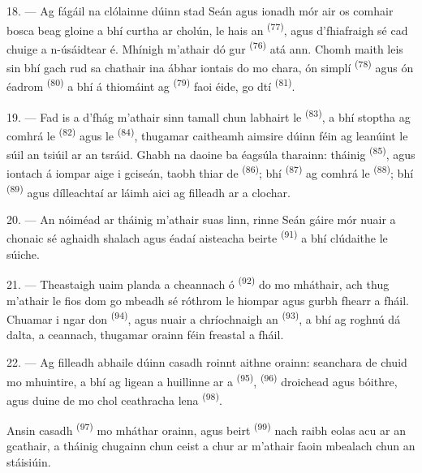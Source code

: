 \VUsaut{3.0mm}

18. --- Ag fágáil na clólainne dúinn stad Seán agus ionadh mór air os comhair bosca
beag gloine a bhí curtha ar cholún, le hais an 
\textsuperscript{(77)}, agus d'fhiafraigh sé cad chuige a n-úsáidtear é. Mhínigh
m'athair dó gur  \textsuperscript{(76)} atá ann. Chomh maith
leis sin bhí gach rud sa chathair ina ábhar iontais do mo chara, ón
 simplí \textsuperscript{(78)} agus ón  éadrom \textsuperscript{(80)} a bhí á thiomáint ag 
\textsuperscript{(79)} faoi éide, go dtí 
\textsuperscript{(81)}.

19. --- Fad is a d'fhág m'athair sinn tamall chun labhairt le  \textsuperscript{(83)}, a bhí stoptha ag comhrá le 
\textsuperscript{(82)} agus le  \textsuperscript{(84)}, thugamar
caitheamh aimsire dúinn féin ag leanúint le súil an tsiúil ar an tsráid. Ghabh na
daoine ba éagsúla tharainn: tháinig 
\textsuperscript{(85)}, agus  iontach á iompar aige i gciseán, taobh
thiar de  \textsuperscript{(86)}; bhí  \textsuperscript{(87)} ag comhrá le 
\textsuperscript{(88)}; bhí  \textsuperscript{(89)} agus
dílleachtaí ar láimh aici ag filleadh ar a clochar.

\VUsaut{3.0mm}

20. --- An nóiméad ar tháinig m'athair suas linn, rinne Seán gáire mór nuair a chonaic
sé aghaidh shalach agus éadaí aisteacha beirte 
\textsuperscript{(91)} a bhí clúdaithe le súiche.

21. --- Theastaigh uaim planda a cheannach ó 
\textsuperscript{(92)} do mo mháthair, ach thug m'athair le fios dom go mbeadh sé
róthrom le hiompar agus gurbh fhearr  a fháil. Chuamar i ngar don
 \textsuperscript{(94)}, agus nuair a chríochnaigh an
 \textsuperscript{(93)}, a bhí ag roghnú dá dalta, a ceannach,
thugamar orainn féin freastal a fháil.

22. --- Ag filleadh abhaile dúinn casadh roinnt aithne orainn: seanchara de chuid mo
mhuintire, a bhí ag ligean a huillinne ar a 
\textsuperscript{(95)},  \textsuperscript{(96)} droichead
agus bóithre, agus duine de mo chol ceathracha lena 
\textsuperscript{(98)}.

Ansin casadh  \textsuperscript{(97)} mo mháthar orainn, agus beirt
 \textsuperscript{(99)} nach raibh eolas acu ar an gcathair, a tháinig
chugainn chun ceist a chur ar m'athair faoin mbealach chun an stáisiúin.
